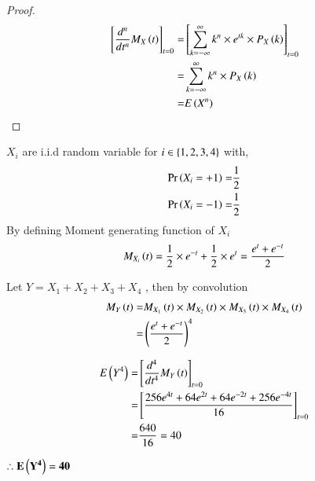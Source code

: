 \documentclass[journal,12pt,twocolumn]{IEEEtran}
\begin{document}
\begin{proof}
\begin{align}
    {\ensuremath{{}\left[\frac{d^n}{d t^n}M_{X}\left(t\right)\right]}}_{t=0}=&{{}\left[\sum_{k=-\infty}^{\infty} k^n \times e^{t k} \times P_X\left(k\right)\right]}_{t=0}
    \\=&\sum_{k=-\infty}^{\infty} k^n \times P_X\left(k\right)
    \\=&E\left(X^n\right)
\end{align}
\end{proof}

$X_i$ are i.i.d random variable for $i \in \left\{1,2,3,4\right\} $ 
with,
\begin{align}
    \Pr\left(X_i=+1\right)=&\frac{1}{2}
    \\\Pr\left(X_i=-1\right)=&\frac{1}{2}
\end{align}
By defining Moment generating function of $X_i$
\begin{align}
    M_{X_i}\left(t\right)=\frac{1}{2}\times e^{-t} + \frac{1}{2} \times e^{t}=\frac{e^{t}+e^{-t}}{2}
\end{align}

Let $Y=X_1+X_2+X_3+X_4$ , then by convolution
\begin{align}
    M_{Y}\left(t\right)=& M_{X_1}\left(t\right) \times M_{X_2}\left(t\right) \times M_{X_3}\left(t\right) \times M_{X_4}\left(t\right) 
    \\ =& \left(\frac{e^{t}+e^{-t}}{2}\right)^4
\end{align}

\begin{align}
    E\left(Y^4\right)=&{{}\left[\frac{d^4}{d t^4}M_Y\left(t\right)\right]}_{t=0} 
    \\=&{{}\left[\frac{256e^{4t}+64e^{2t}+64e^{-2t}+256e^{-4t}}{16}\right]}_{t=0}
    \\=&\frac{640}{16}=40
\end{align}

{\centering
$\mathbf{\therefore E\left(Y^4\right)=40}$

}
\end{document}
